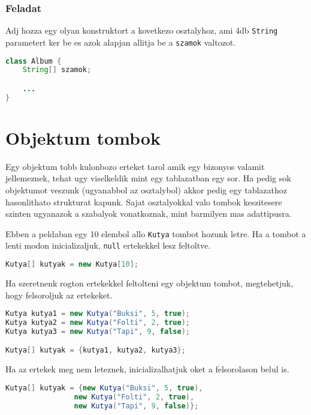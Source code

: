 \documentclass{article}
\let\l\lstinline
\begin{document}
\subsubsection{Feladat}

Adj hozza egy olyan konstruktort a kovetkezo osztalyhoz, ami 4db \l{String} parametert ker be es azok alapjan
allitja be
a \l{szamok} valtozot.

\begin{lstlisting}[language=Java, caption=Feladat]
class Album {
    String[] szamok;

    ...
}
\end{lstlisting}

\newpage

\section{Objektum tombok}

Egy objektum tobb kulonbozo erteket tarol amik egy bizonyos valamit jellemeznek, tehat ugy viselkeldik mint egy
tablazatban egy sor. Ha pedig sok objektumot veszunk (ugyanabbol az osztalybol) akkor pedig egy tablazathoz
hasonlithato strukturat kapunk. Sajat osztalyokkal valo tombok keszitesere szinten ugyanazok a szabalyok vonatkoznak,
mint barmilyen mas adattipusra.

Ebben a peldaban egy 10 elembol allo \l{Kutya} tombot hozunk letre. Ha a tombot a lenti modon inicializaljuk,
\l{null} ertekekkel lesz feltoltve.

\begin{lstlisting}[language=Java, caption=Kutya tomb keszitese - 1. modszer]
Kutya[] kutyak = new Kutya[10];
\end{lstlisting}

Ha szeretnenk rogton ertekekkel feltolteni egy objektum tombot, megtehetjuk, hogy felsoroljuk az ertekeket.

\begin{lstlisting}[language=Java, caption=Kutya tomb keszitese - 2. modszer]
Kutya kutya1 = new Kutya("Buksi", 5, true);
Kutya kutya2 = new Kutya("Folti", 2, true);
Kutya kutya3 = new Kutya("Tapi", 9, false);

Kutya[] kutyak = {kutya1, kutya2, kutya3};
\end{lstlisting}

Ha az ertekek meg nem leteznek, inicializalhatjuk oket a felsorolason belul is.

\begin{lstlisting}[language=Java, caption=Kutya tomb keszitese - 3. modszer]
Kutya[] kutyak = {new Kutya("Buksi", 5, true),
                new Kutya("Folti", 2, true),
                new Kutya("Tapi", 9, false)};
\end{lstlisting}
\end{document}
